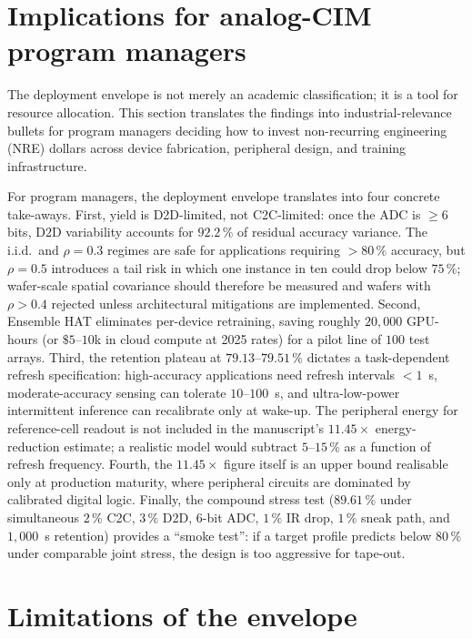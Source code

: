 \section{Implications for analog-CIM program managers}
\label{sec:program-manager}

The deployment envelope is not merely an academic classification; it is a tool for resource allocation.  This section translates the findings into industrial-relevance bullets for program managers deciding how to invest non-recurring engineering (NRE) dollars across device fabrication, peripheral design, and training infrastructure.

For program managers, the deployment envelope translates into four concrete take-aways.  First, yield is D2D-limited, not C2C-limited: once the ADC is $\ge 6$ bits, D2D variability accounts for $92.2\,\%$ of residual accuracy variance.  The i.i.d.~and $\rho=0.3$ regimes are safe for applications requiring $>80\,\%$ accuracy, but $\rho=0.5$ introduces a tail risk in which one instance in ten could drop below $75\,\%$; wafer-scale spatial covariance should therefore be measured and wafers with $\rho > 0.4$ rejected unless architectural mitigations are implemented.  Second, Ensemble HAT eliminates per-device retraining, saving roughly $20{,}000$ GPU-hours (or $\$5$--$10$k in cloud compute at 2025 rates) for a pilot line of $100$ test arrays.  Third, the retention plateau at $79.13$--$79.51\,\%$ dictates a task-dependent refresh specification: high-accuracy applications need refresh intervals $<1$~s, moderate-accuracy sensing can tolerate $10$--$100$~s, and ultra-low-power intermittent inference can recalibrate only at wake-up.  The peripheral energy for reference-cell readout is not included in the manuscript's $11.45\times$ energy-reduction estimate; a realistic model would subtract $5$--$15\,\%$ as a function of refresh frequency.  Fourth, the $11.45\times$ figure itself is an upper bound realisable only at production maturity, where peripheral circuits are dominated by calibrated digital logic.  Finally, the compound stress test ($89.61\,\%$ under simultaneous $2\,\%$ C2C, $3\,\%$ D2D, 6-bit ADC, $1\,\%$ IR drop, $1\,\%$ sneak path, and $1{,}000$~s retention) provides a ``smoke test'': if a target profile predicts below $80\,\%$ under comparable joint stress, the design is too aggressive for tape-out.


\section{Limitations of the envelope}
\label{sec:envelope-limitations}

